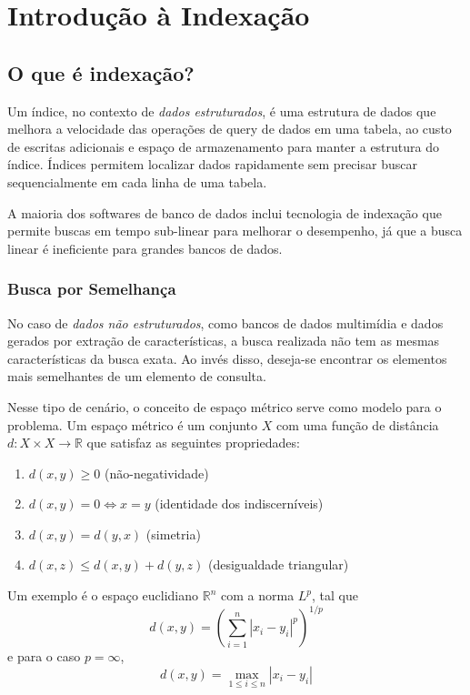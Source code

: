 \chapter{Introdução à Indexação}

\section{O que é indexação?}

Um índice, no contexto de \textit{dados estruturados}, é uma estrutura de dados que melhora a velocidade das operações de query de dados em uma tabela, ao custo de escritas adicionais e espaço de armazenamento para manter a estrutura do índice. Índices permitem localizar dados rapidamente sem precisar buscar sequencialmente em cada linha de uma tabela.

A maioria dos softwares de banco de dados inclui tecnologia de indexação que permite buscas em tempo sub-linear para melhorar o desempenho, já que a busca linear é ineficiente para grandes bancos de dados.

\cite{databaseindex:wiki}

\subsection{Busca por Semelhança}

No caso de \textit{dados não estruturados}, como bancos de dados multimídia e dados gerados por extração de características, a busca realizada não tem as mesmas características da busca exata. Ao invés disso, deseja-se encontrar os elementos mais semelhantes de um elemento de consulta.

Nesse tipo de cenário, o conceito de espaço métrico serve como modelo para o problema. Um espaço métrico é um conjunto $X$ com uma função de distância $d: X \times X \to \mathbb{R}$ que satisfaz as seguintes propriedades:

\begin{enumerate}
    \item $d(x, y) \geq 0$ (não-negatividade)
    \item $d(x, y) = 0 \iff x = y$ (identidade dos indiscerníveis)
    \item $d(x, y) = d(y, x)$ (simetria)
    \item $d(x, z) \leq d(x, y) + d(y, z)$ (desigualdade triangular)
\end{enumerate}

Um exemplo é o espaço euclidiano $\mathbb{R}^n$ com a norma $L^p$, tal que
$$d(x, y) = \left(\sum_{i = 1}^n|x_i - y_i|^p\right)^{1/p}$$
e para o caso $p = \infty$,
$$d(x, y) = \max_{1 \le i \le n}|x_i - y_i|$$

